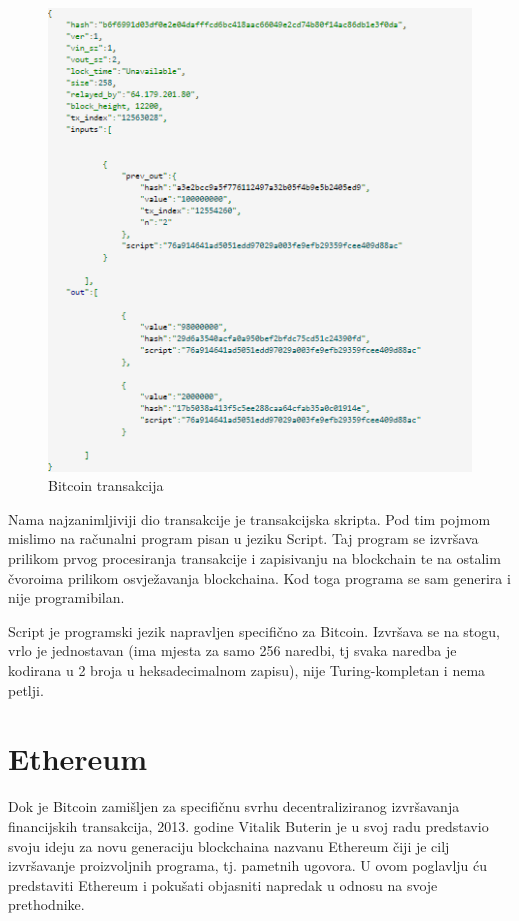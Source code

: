 \documentclass[a4paper,oneside,12pt]{memoir} %
\begin{document}
\begin{figure}[H]
\centering
\includegraphics[scale=0.73]{transakcija}
\caption{Bitcoin transakcija}
\label{fig:transakcija}
\end{figure}

Nama najzanimljiviji dio transakcije je transakcijska skripta. Pod tim pojmom mislimo na računalni program pisan u jeziku Script. Taj program se izvršava prilikom prvog procesiranja transakcije i zapisivanju na blockchain te na ostalim čvoroima prilikom osvježavanja blockchaina. Kod toga programa se sam generira i nije programibilan. 

Script\cite{script} je programski jezik napravljen specifično za Bitcoin. Izvršava se na stogu, vrlo je jednostavan (ima mjesta za samo 256 naredbi, tj svaka naredba je kodirana u 2 broja u heksadecimalnom zapisu), nije Turing-kompletan i nema petlji.

\chapter{Ethereum}

Dok je Bitcoin zamišljen za specifičnu svrhu decentraliziranog izvršavanja financijskih transakcija, 2013. godine Vitalik Buterin je u svoj radu\cite{eth_paper} predstavio svoju ideju za novu generaciju blockchaina nazvanu Ethereum čiji je cilj izvršavanje proizvoljnih programa, tj. pametnih ugovora. U ovom poglavlju ću predstaviti Ethereum i pokušati objasniti napredak u odnosu na svoje prethodnike.
\end{document}
